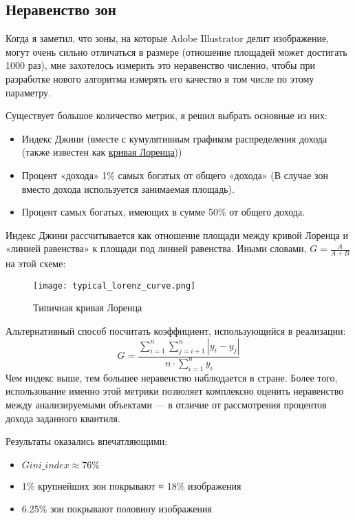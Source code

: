 \subsection{Неравенство зон}\label{subsec:inequality}
Когда я заметил, что зоны, на которые Adobe Illustrator делит изображение, могут очень сильно отличаться в размере (отношение площадей может достигать 1000 раз),
мне захотелось измерить это неравенство численно, чтобы при разработке нового алгоритма измерять его качество в том числе по этому параметру.

Существует большое количество метрик, я решил выбрать основные из них:
\begin{itemize}
    \item Индекс Джини (вместе с кумулятивным графиком распределения дохода (также известен как \href{https://en.wikipedia.org/wiki/Lorenz_curve}{кривая Лоренца}))
    \item Процент «дохода» 1\% самых богатых от общего «дохода» (В случае зон вместо дохода используется занимаемая площадь).
    \item Процент самых богатых, имеющих в сумме 50\% от общего дохода.
\end{itemize}

Индекс Джини рассчитывается как отношение площади между кривой Лоренца и «линией равенства» к площади под линией равенства.
Иными словами, $G = \frac{A}{A + B}$ на этой схеме:

\begin{figure}[h!]\label{fig:lorenz_curve}
    \centering
    \texttt{[image: typical\_lorenz\_curve.png]}
    \caption{Типичная кривая Лоренца}
\end{figure}
Альтернативный способ посчитать коэффициент, использующийся в реализации:
\begin{equation}
    G = \frac{\sum_{i=1}^{n}  \sum_{j=i+1}^{n}  \left| y_i - y_j \right|}{n \cdot \sum_{i=1}^{n} y_i}
\end{equation}
Чем индекс выше, тем большее неравенство наблюдается в стране.
Более того, использование именно этой метрики позволяет комплексно оценить неравенство между анализируемыми объектами —
в отличие от рассмотрения процентов дохода заданного квантиля.


Результаты оказались впечатляющими:
\begin{itemize}
    \item $Gini\_index \approx 76\%$
    \item 1\% крупнейших зон покрывают ≈ 18\% изображения
    \item 6.25\% зон покрывают половину изображения
\end{itemize}

